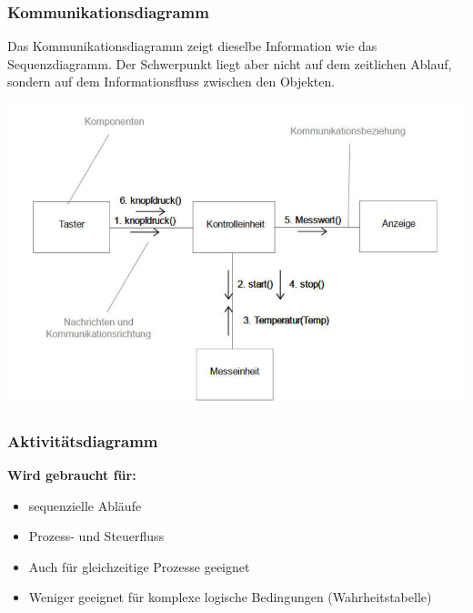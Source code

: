 \newpage
\subsubsection{Kommunikationsdiagramm}
\begin{minipage}[][][t]{0.4\linewidth}
Das Kommunikationsdiagramm zeigt dieselbe Information wie das Sequenzdiagramm. Der Schwerpunkt liegt aber
nicht auf dem zeitlichen Ablauf, sondern auf dem Informationsfluss zwischen den Objekten.
\end{minipage}%
\begin{minipage}{0.6\linewidth}
\begin{center}
\includegraphics[width=0.8\linewidth]{images/Modellierung/Kommunikationsdiagramm}
\end{center}
\end{minipage}

\subsubsection{Aktivitätsdiagramm}
\textbf{Wird gebraucht für:}
\begin{itemize}
	\item sequenzielle Abläufe
	\item Prozess- und Steuerfluss
	\item Auch für gleichzeitige Prozesse geeignet
	\item Weniger geeignet für komplexe logische Bedingungen (Wahrheitstabelle)
\end{itemize}

